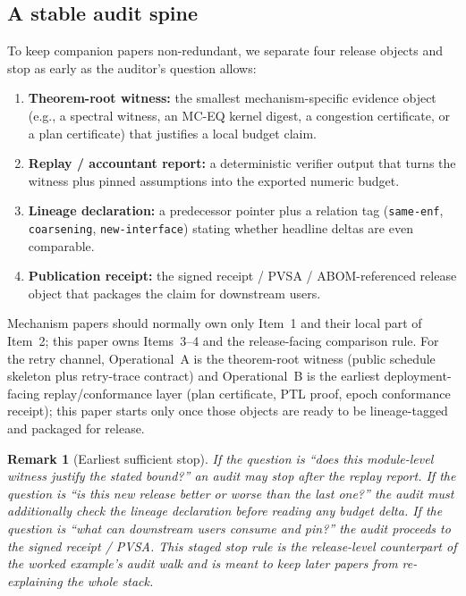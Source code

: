 \documentclass[11pt]{article}
\newtheorem{remark}{Remark}
\begin{document}
\subsection{A stable audit spine}
To keep companion papers non-redundant, we separate four release objects and stop as early as the auditor's question allows:
\begin{enumerate}[leftmargin=1.4em]
\item \textbf{Theorem-root witness:} the smallest mechanism-specific evidence object (e.g., a spectral witness, an MC-EQ kernel digest, a congestion certificate, or a plan certificate) that justifies a local budget claim.
\item \textbf{Replay / accountant report:} a deterministic verifier output that turns the witness plus pinned assumptions into the exported numeric budget.
\item \textbf{Lineage declaration:} a predecessor pointer plus a relation tag (\texttt{same-enf}, \texttt{coarsening}, \texttt{new-interface}) stating whether headline deltas are even comparable.
\item \textbf{Publication receipt:} the signed receipt / PVSA / ABOM-referenced release object that packages the claim for downstream users.
\end{enumerate}
Mechanism papers should normally own only Item~1 and their local part of Item~2; this paper owns Items~3--4 and the release-facing comparison rule.
For the retry channel, Operational~A is the theorem-root witness (public schedule skeleton plus retry-trace contract) and Operational~B is the earliest deployment-facing replay/conformance layer (plan certificate, PTL proof, epoch conformance receipt); this paper starts only once those objects are ready to be lineage-tagged and packaged for release.\cite{series:schedretries,series:proofcarryingbudgets}

\begin{remark}[Earliest sufficient stop]
If the question is ``does this module-level witness justify the stated bound?'' an audit may stop after the replay report.
If the question is ``is this new release better or worse than the last one?'' the audit must additionally check the lineage declaration before reading any budget delta.
If the question is ``what can downstream users consume and pin?'' the audit proceeds to the signed receipt / PVSA.
This staged stop rule is the release-level counterpart of the worked example's audit walk and is meant to keep later papers from re-explaining the whole stack.
\end{remark}
\end{document}
